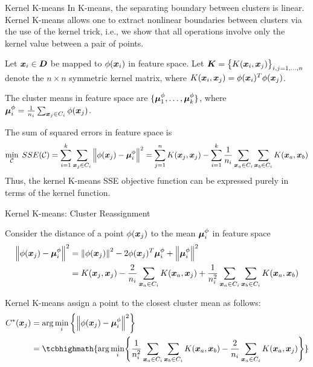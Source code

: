 \begin{frame}{Kernel K-means}
In K-means, the separating boundary between clusters is
linear. Kernel K-means 
allows one to extract nonlinear
boundaries between clusters via the use of the kernel trick, i.e., we
show that all operations involve only the kernel value between a pair of
points.
%

\medskip
Let  ${\boldsymbol x}_i \in {\boldsymbol D}$ be mapped
to $\phi({\boldsymbol x}_i)$ in feature space.
Let ${\boldsymbol K} = \bigl\{K({\boldsymbol x}_i,
{\boldsymbol x}_{j})\bigr\}_{i,j=1,\dots,n}$
denote the $n \times n$ symmetric kernel matrix,
where $K({\boldsymbol x}_i,{\boldsymbol x}_{j}) = \phi({\boldsymbol x}_i)^T\phi({\boldsymbol x}_{j})$.

\medskip
The cluster means in
feature space are $\{{\bm \mu}^\phi_1, \ldots, {\bm \mu}^\phi_k\}$, where
${\bm \mu}^\phi_i = {1 \over n_i} \sum_{{\boldsymbol x}_{j} \in C_i} \phi({\boldsymbol x}_{j})$.


\medskip
The sum of squared errors in feature space is
\begin{align*}
    \min_{{\mathcal C}} \; SSE({\mathcal C}) =
    \sum_{i=1}^k \sum_{{\boldsymbol x}_{j} \in C_i}
    \left\lVert\phi({\boldsymbol x}_{j}) -{\bm \mu}^\phi_i\right\rVert^2
     = \sum_{j=1}^n K({\boldsymbol x}_{j}, {\boldsymbol x}_{j}) -
    \sum_{i=1}^k {1\over n_i} \sum_{{\boldsymbol x}_a \in C_i}
      \sum_{{\boldsymbol x}_b \in C_i} K({\boldsymbol x}_a, {\boldsymbol x}_b)
\end{align*}
Thus, the kernel K-means SSE objective function can be expressed purely in
terms of the kernel function.
\end{frame}

\begin{frame}{Kernel K-means: Cluster Reassignment}

Consider the distance of a point $\phi({\boldsymbol x}_{j})$ to
the mean ${\bm \mu}_i^\phi$ in feature space
\begin{align*}
    \left\lVert\phi({\boldsymbol x}_{j}) - {\bm \mu}^\phi_i\right\rVert^2 & =
        \left\lVert\phi({\boldsymbol x}_{j})\right\rVert^2 - 2 \phi({\boldsymbol x}_{j})^T{\bm \mu}^\phi_i +
        \left\lVert{\bm \mu}^\phi_i\right\rVert^2\\
     & = K({\boldsymbol x}_{j}, {\boldsymbol x}_{j})
     - \frac{2}{n_i} \sum_{{\boldsymbol x}_a \in C_i} K({\boldsymbol x}_a, {\boldsymbol x}_{j})
     + {1\over n_i^2} \sum_{{\boldsymbol x}_a\in C_i} \sum_{{\boldsymbol x}_b \in C_i}
        K({\boldsymbol x}_a, {\boldsymbol x}_b)
\end{align*}

Kernel K-means assign a point to the closest cluster mean as
follows:
\begin{align*}
    C^*(\bx_{j}) & = \arg \min_{i} \lB\{
    \norm{\phi(\bx_{j}) - \bmu^\phi_i}^2  \rB\}\\
    & = 
\tcbhighmath{
\arg \min_{i} \Biggl\{
    {1\over n_i^2} \sum_{\bx_a\in C_i} \sum_{\bx_b \in C_i}
        K(\bx_a, \bx_b)
     - \frac{2}{n_i} \sum_{\bx_a \in C_i} K(\bx_a, \bx_{j})
    \Biggr\}
}
\end{align*}
\end{frame}



